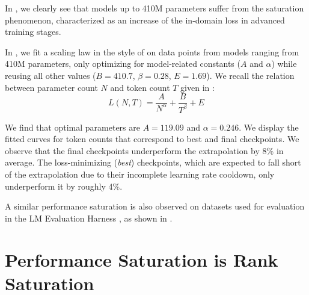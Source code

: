 In , we clearly see that models up to 410M parameters suffer from the saturation phenomenon, characterized as an increase of the in-domain loss in advanced training stages. 

In , we fit a scaling law in the style of \citet{chinchilla_scaling} on data points from models ranging from 410M parameters, only optimizing for model-related constants ($A$ and $\alpha$) while reusing all other values ($B=410.7$, $\beta=0.28$, $E=1.69$). We recall the relation between parameter count $N$ and token count $T$ given in \citet{chinchilla_scaling}:
$$
L(N, T) = \frac{A}{N^\alpha} + \frac{B}{T^\beta} + E
$$

We find that optimal parameters are $A=119.09$ and $\alpha=0.246$. We display the fitted curves for token counts that correspond to best and final checkpoints. We observe that the final checkpoints underperform the extrapolation by 8\% in average. The loss-minimizing (\textit{best}) checkpoints, which are expected to fall short of the extrapolation due to their incomplete learning rate cooldown, only underperform it by roughly 4\%.

A similar performance saturation is also observed on datasets used for evaluation in the LM Evaluation Harness \citep{eval-harness}, as shown in .

\begin{table}[h]
\centering
{}
\caption{Zero-shot performance of Pythia-160M best and final checkpoints on evaluation datasets. Unless specified, we report accuracy for all tasks.}
\label{tab:perf_gap}
\end{table}


\section{Performance Saturation is Rank Saturation}
